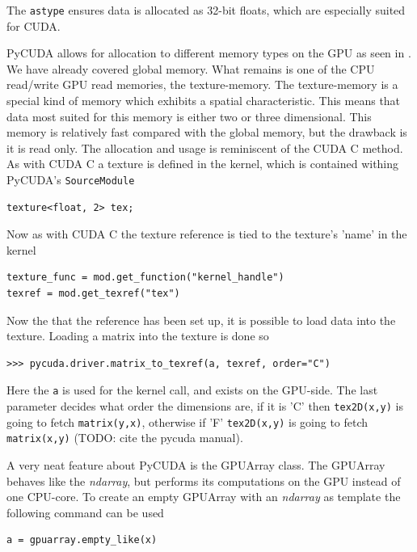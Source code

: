 The \texttt{astype} ensures data is allocated as 32-bit floats, which are especially suited for CUDA.

PyCUDA allows for allocation to different memory types on the GPU as seen in . We have already covered global memory. What remains is one of the CPU read/write GPU read memories, the texture-memory. The texture-memory is a special kind of memory which exhibits a spatial characteristic. This means that data most suited for this memory is either two or three dimensional. This memory is relatively fast compared with the global memory, but the drawback is it is read only. The allocation and usage is reminiscent of the CUDA C method. As with CUDA C a texture is defined in the kernel, which is contained withing PyCUDA's \texttt{SourceModule}

\begin{verbatim}
texture<float, 2> tex;
\end{verbatim}

Now as with CUDA C the texture reference is tied to the texture's 'name' in the kernel

\begin{verbatim}
texture_func = mod.get_function("kernel_handle")
texref = mod.get_texref("tex")
\end{verbatim}

Now the that the reference has been set up, it is possible to load data into the texture. Loading a matrix into the texture is done so

\begin{verbatim}
>>> pycuda.driver.matrix_to_texref(a, texref, order="C")
\end{verbatim}

Here the \texttt{a} is used for the kernel call, and exists on the GPU-side. The last parameter decides what order the dimensions are, if it is 'C' then \texttt{tex2D(x,y)} is going to fetch \texttt{matrix(y,x)}, otherwise if 'F' \texttt{tex2D(x,y)} is going to fetch \texttt{matrix(x,y)} (TODO: cite the pycuda manual).

A very neat feature about PyCUDA is the GPUArray class. The GPUArray behaves like the \textit{ndarray}, but performs its computations on the GPU instead of one CPU-core. To create an empty GPUArray with an \textit{ndarray} as template the following command can be used

\begin{verbatim}
a = gpuarray.empty_like(x)
\end{verbatim}

